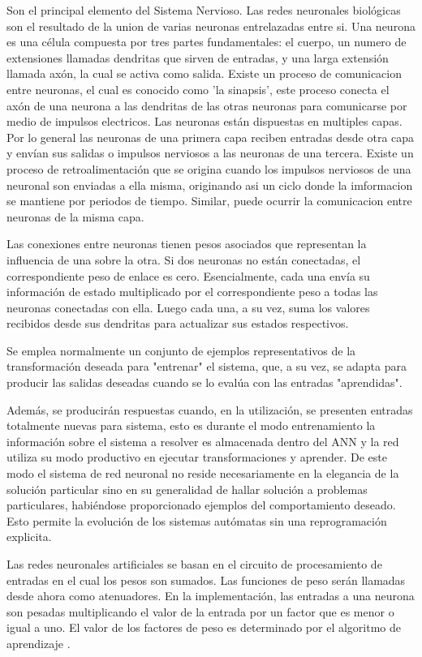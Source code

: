 Son el principal elemento del Sistema Nervioso. Las redes neuronales biológicas son el resultado de la union de varias neuronas entrelazadas entre si. Una neurona es una célula compuesta por tres partes fundamentales: el cuerpo, un numero de extensiones llamadas dendritas que sirven de entradas, y una larga extensión llamada axón, la cual se activa como salida. Existe un proceso de comunicacion entre neuronas, el cual es conocido como 'la sinapsis', este proceso conecta el axón de una neurona a las dendritas de las otras neuronas para comunicarse por medio de impulsos electricos. Las neuronas están dispuestas en multiples capas. Por lo general las neuronas de una primera capa reciben entradas desde otra capa y envían sus salidas o impulsos nerviosos a las neuronas de una tercera. Existe un proceso de retroalimentación que se origina cuando los impulsos nerviosos de una neuronal son enviadas a ella misma, originando asi un ciclo donde la imformacion se mantiene por periodos de tiempo. Similar, puede ocurrir la comunicacion entre neuronas de la misma capa.

Las conexiones entre neuronas tienen pesos asociados que representan la influencia de una sobre la otra. Si dos neuronas no están conectadas, el correspondiente peso de enlace es cero. Esencialmente, cada una envía su información de estado multiplicado por el correspondiente peso a todas las neuronas conectadas con ella. Luego
cada una, a su vez, suma los valores recibidos desde sus dendritas para actualizar sus estados respectivos.

Se emplea normalmente un conjunto de ejemplos representativos de la
transformación deseada para "entrenar" el sistema, que, a su vez, se adapta para producir
las salidas deseadas cuando se lo evalúa con las entradas "aprendidas".

Además, se producirán respuestas cuando, en la utilización, se presenten entradas
totalmente nuevas para sistema, esto es durante el modo entrenamiento la información
sobre el sistema a resolver es almacenada dentro del ANN y la red utiliza su modo
productivo en ejecutar transformaciones y aprender. De este modo el sistema de red
neuronal no reside necesariamente en la elegancia de la solución particular sino en su
generalidad de hallar solución a problemas particulares, habiéndose proporcionado
ejemplos del comportamiento deseado. Esto permite la evolución de los sistemas
autómatas sin una reprogramación explicita.

Las redes neuronales artificiales se basan en el circuito de procesamiento de
entradas en el cual los pesos son sumados. Las funciones de peso serán llamadas desde
ahora como atenuadores. En la implementación, las entradas a una neurona son pesadas
multiplicando el valor de la entrada por un factor que es menor o igual a uno. El valor de
los factores de peso es determinado por el algoritmo de aprendizaje \cite{21RedesNeuronales}.

